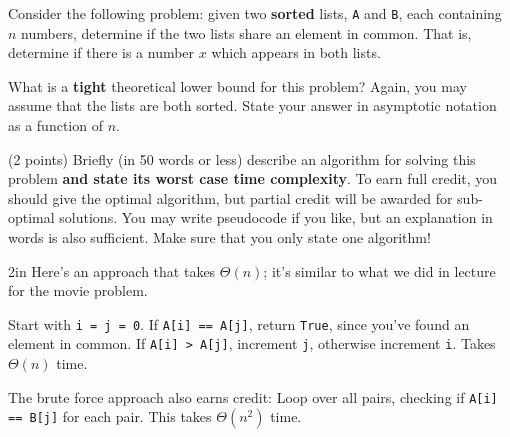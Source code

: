 \begin{prob}[(3 points)]

    Consider the following problem: given two \textbf{sorted} lists, \texttt{A}
    and \texttt{B}, each containing $n$ numbers, determine if the two lists
    share an element in common. That is, determine if there is a number $x$
    which appears in both lists.

    \begin{subprobset}

        \begin{subprob}
            What is a \textbf{tight} theoretical lower bound for this problem?
            Again, you may assume that the lists are both sorted.
            State your answer in asymptotic notation as a function of $n$.

        \end{subprob}

        \begin{subprob}(2 points)
            Briefly (in 50 words or less) describe an algorithm for solving
            this problem \textbf{and state its worst case time complexity}. To
            earn full credit, you should give the optimal algorithm, but
            partial credit will be awarded for sub-optimal solutions. You may
            write pseudocode if you like, but an explanation in words is also
            sufficient. Make sure that you only state one algorithm!

            \begin{soln}{2in}
                Here's an approach that takes $\Theta(n)$; it's similar to what we did in lecture
                for the movie problem.

                Start with \texttt{i = j = 0}. If \texttt{A[i] == A[j]}, return \texttt{True}, since
                you've found an element in common. If \texttt{A[i] > A[j]}, increment \texttt{j}, otherwise
                increment \texttt{i}. Takes $\Theta(n)$ time.

                The brute force approach also earns credit: Loop over all pairs, checking if 
                \texttt{A[i] == B[j]} for each pair. This takes $\Theta(n^2)$ time.

            \end{soln}

        \end{subprob}

    \end{subprobset}

\end{prob}
